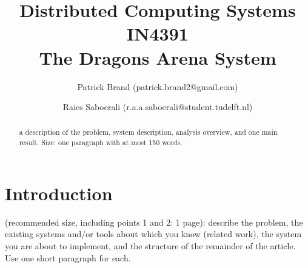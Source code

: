 \documentclass{article}
\title{Distributed Computing Systems IN4391\\ The Dragons Arena System %
}
\author{Patrick Brand (patrick.brand2@gmail.com) \and
    Raies Saboerali (r.a.a.saboerali@student.tudelft.nl)}
\date{}
\begin{document}
\maketitle
\thispagestyle{empty}

\begin{abstract}
a description of the problem, system description, analysis overview, and one
main result. Size: one paragraph with at most 150 words.
\end{abstract}


\section{Introduction}

(recommended size, including points 1 and 2: 1 page): describe the problem, the existing systems and/or tools about which you know (related work), the system you are about to implement, and the structure of the remainder of the article. Use one short paragraph for each.

\newpage









  



\nocite{*}


\end{document}
